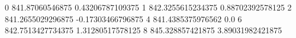 0 841.87060546875 0.43206787109375
1 842.3255615234375 0.88702392578125
2 841.2655029296875 -0.17303466796875
4 841.4385375976562 0.0
6 842.7513427734375 1.31280517578125
8 845.328857421875 3.89031982421875
